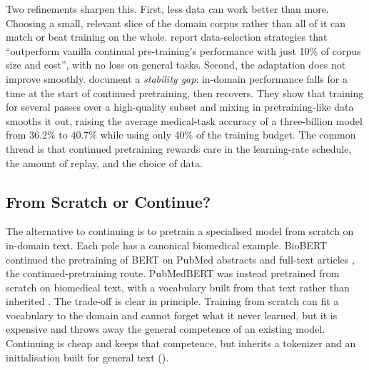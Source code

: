 Two refinements sharpen this. First, less data can work better than more. Choosing a
small, relevant slice of the domain corpus rather than all of it can match or beat
training on the whole. \citet{xie2024efficientcpt} report data-selection strategies
that ``outperform vanilla continual pre-training's performance with just 10\% of
corpus size and cost'', with no loss on general tasks. Second, the adaptation does not
improve smoothly. \citet{guo2024efficient} document a \emph{stability gap}: in-domain
performance falls for a time at the start of continued pretraining, then recovers. They
show that training for several passes over a high-quality subset and mixing in
pretraining-like data smooths it out, raising the average medical-task accuracy of a
three-billion model from 36.2\% to 40.7\% while using only 40\% of the training budget.
The common thread is that continued pretraining rewards care in the learning-rate
schedule, the amount of replay, and the choice of data.

\subsection{From Scratch or Continue?}

The alternative to continuing is to pretrain a specialised model from scratch on
in-domain text. Each pole has a canonical biomedical example. BioBERT continued
the pretraining of BERT on PubMed abstracts and full-text articles
\citep{lee_biobert_2019}, the continued-pretraining route. PubMedBERT was instead
pretrained from scratch on biomedical text, with a vocabulary built from that text
rather than inherited \citep{gu_domain-specific_2022}. The trade-off is clear in
principle. Training from scratch can fit a vocabulary to the domain and cannot forget
what it never learned, but it is expensive and throws away the general competence of
an existing model. Continuing is cheap and keeps that competence, but inherits a
tokenizer and an initialisation built for general text ().

